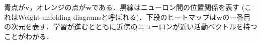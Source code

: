 青点が$\mathbf{v}$，オレンジの点が$\mathbf{w}$である．黒線はニューロン間の位置関係を表す (これはWeight unfolding diagramsと呼ばれる)．下段のヒートマップは$\mathbf{w}$の一番目の次元を表す．学習が進むとともに近傍のニューロンが近い活動ベクトルを持つことがわかる．